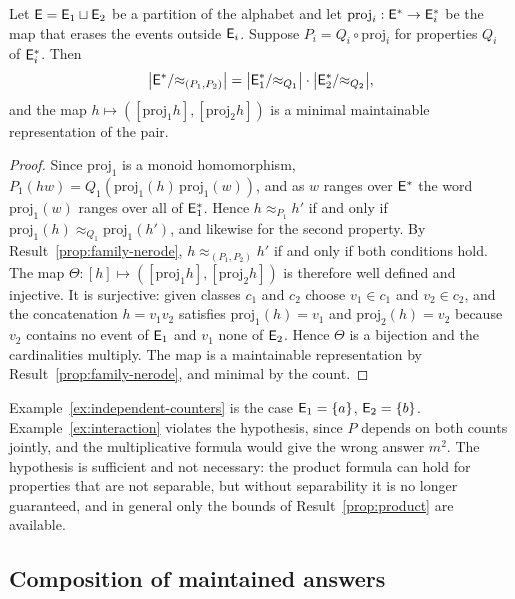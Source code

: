 \begin{newresult}\label{thm:independence}
Let $\mathsf{E}=\mathsf{E}_1\sqcup\mathsf{E}_2$ be a partition of the alphabet and let $\mathrm{proj}_i:\mathsf{E}^{*}\to\mathsf{E}_i^{*}$ be the map that erases the events outside $\mathsf{E}_i$. Suppose $P_i=Q_i\circ\mathrm{proj}_i$ for properties $Q_i$ of $\mathsf{E}_i^{*}$. Then
\[
\bigl|\mathsf{E}^{*}/{\approx_{(P_1,P_2)}}\bigr|=\bigl|\mathsf{E}_1^{*}/{\approx_{Q_1}}\bigr|\cdot\bigl|\mathsf{E}_2^{*}/{\approx_{Q_2}}\bigr|,
\]
and the map $h\mapsto([\mathrm{proj}_1h],[\mathrm{proj}_2h])$ is a minimal maintainable representation of the pair.
\end{newresult}
\begin{proof}
Since $\mathrm{proj}_1$ is a monoid homomorphism, $P_1(hw)=Q_1(\mathrm{proj}_1(h)\,\mathrm{proj}_1(w))$, and as $w$ ranges over $\mathsf{E}^{*}$ the word $\mathrm{proj}_1(w)$ ranges over all of $\mathsf{E}_1^{*}$. Hence $h\approx_{P_1}h'$ if and only if $\mathrm{proj}_1(h)\approx_{Q_1}\mathrm{proj}_1(h')$, and likewise for the second property. By Result~\ref{prop:family-nerode}, $h\approx_{(P_1,P_2)}h'$ if and only if both conditions hold. The map $\Theta:[h]\mapsto([\mathrm{proj}_1h],[\mathrm{proj}_2h])$ is therefore well defined and injective. It is surjective: given classes $c_1$ and $c_2$ choose $v_1\in c_1$ and $v_2\in c_2$, and the concatenation $h=v_1v_2$ satisfies $\mathrm{proj}_1(h)=v_1$ and $\mathrm{proj}_2(h)=v_2$ because $v_2$ contains no event of $\mathsf{E}_1$ and $v_1$ none of $\mathsf{E}_2$. Hence $\Theta$ is a bijection and the cardinalities multiply. The map is a maintainable representation by Result~\ref{prop:family-nerode}, and minimal by the count.
\end{proof}

Example~\ref{ex:independent-counters} is the case $\mathsf{E}_1=\{a\}$, $\mathsf{E}_2=\{b\}$. Example~\ref{ex:interaction} violates the hypothesis, since $P$ depends on both counts jointly, and the multiplicative formula would give the wrong answer $m^{2}$. The hypothesis is sufficient and not necessary: the product formula can hold for properties that are not separable, but without separability it is no longer guaranteed, and in general only the bounds of Result~\ref{prop:product} are available.

\subsection{Composition of maintained answers}

